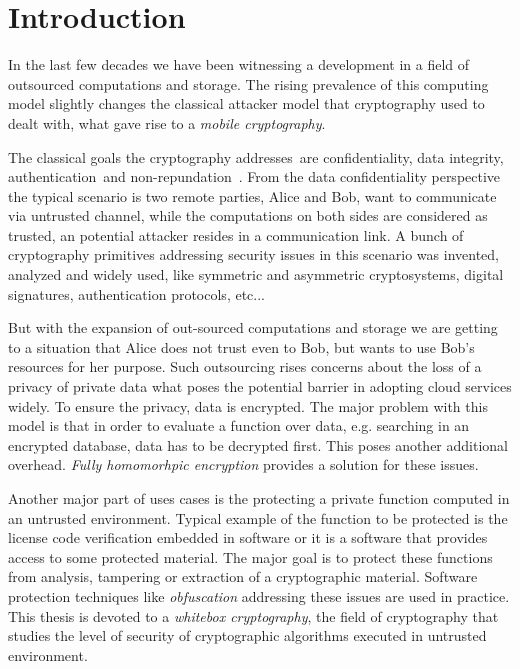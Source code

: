 \documentclass[11pt,oneside,final]{fithesis2}
\begin{document}

\chapter{Introduction}
    
    
    In the last few decades we have been witnessing a development in a field of outsourced computations and storage.
    The rising prevalence of this computing model slightly changes the classical attacker model 
    that cryptography used to dealt with, what gave rise to a \emph{mobile cryptography}.

    The classical goals the cryptography addresses~are confidentiality, data integrity, authentication~and non-repundation~\citep{Menezes:1996:HAC:548089}.
    From the data confidentiality perspective the typical scenario is two remote parties, Alice and Bob, want to communicate via untrusted channel, while the 
    computations on both sides are considered as trusted, an potential attacker resides in a communication link.
    A bunch of cryptography primitives addressing security issues in this scenario
    was invented, analyzed and widely used, like symmetric and asymmetric cryptosystems, digital signatures, authentication protocols, etc...
    
    But with the expansion of out-sourced computations and storage we are getting to a situation that Alice does not trust even to Bob, but wants 
    to use Bob's resources for her purpose. Such outsourcing rises concerns about the loss of a privacy of private data what poses the potential
    barrier in adopting cloud services widely. To ensure the privacy, data is encrypted. The major problem with this model 
    is that in order to evaluate a function over data, e.g. searching in an encrypted database, data has to be decrypted first. This poses another additional 
    overhead. \emph{Fully homomorhpic encryption} provides a solution for these issues.
    
    Another major part of uses cases is the protecting a private function computed in an untrusted environment. Typical example
    of the function to be protected is the license code verification embedded in software or it is a software that provides access 
    to some protected material.  The major goal is to protect these
    functions from analysis, tampering or extraction of a cryptographic material. Software protection techniques like \emph{obfuscation}
    addressing these issues are used in practice. This thesis is devoted to a \emph{whitebox cryptography}, the field of 
    cryptography that studies the level of security of cryptographic algorithms executed in untrusted environment.
\end{document}
